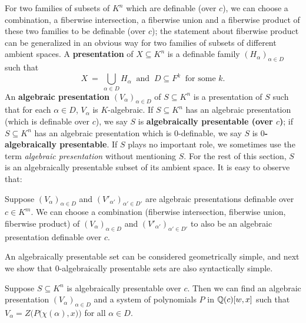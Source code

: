 For two families of subsets of $K^n$ which are definable (over $c$), we can choose  a combination, a fiberwise intersection, a fiberwise union and a fiberwise product of these two families to be definable (over $c$); the statement about fiberwise product can be generalized in an obvious way for two families of subsets of different ambient spaces.
A {\bf presentation} of  $X \subseteq K^n$ is a definable family $( H_\alpha)_{\alpha \in D}$ such that $$X\ =\ \bigcup_{\alpha \in D} H_\alpha\ \text{ and }\ D\subseteq F^k\ \text{ for some } k.$$ 
An {\bf algebraic presentation} $( V_\alpha)_{\alpha \in D}$ of $S\subseteq K^n$ is a presentation of $S$ such that for each $\alpha \in D$, $V_\alpha$ is $K$-algebraic.
If $ S \subseteq K^n$ has an algebraic presentation (which is definable over $c$), we say $S$ is { \bf algebraically presentable (over $c$)}; if $S\subseteq K^n$ has an algebraic presentation which is $0$-definable, we say $S$ is {\bf $0$-algebraically presentable}. If $S$ plays no important role, we sometimes use the term {\it algebraic presentation} without mentioning $S$. For the rest of this section, $S$ is an algebraically presentable subset of its ambient space. It is easy to observe that:

\begin{lem}
Suppose  $(V_\alpha)_{ \alpha \in D}$  and  $(V'_{\alpha'})_{ \alpha' \in D'}$ are algebraic presentations definable over $c \in K^m$.
We can choose a combination (fiberwise intersection, fiberwise union, fiberwise product) of $(V_\alpha)_{ \alpha \in D}$ and $(V'_{\alpha'})_{ \alpha' \in D'}$  to also be an algebraic presentation definable over $c$. 
\end{lem}


\noindent
An algebraically presentable set can be considered geometrically simple, and next we show that $0$-algebraically presentable sets are also syntactically simple.

\begin{lem} \label{APsimple1}
Suppose $ S \subseteq K^n$ is algebraically presentable over $c$. Then we can find an algebraic presentation $(V_\alpha)_{ \alpha \in D}$ and a system of polynomials $P$ in $\mathbb{Q}(c)[w,x]$ such that $V_\alpha = Z\Big( P\big(\chi(\alpha),x\big)\Big)$ for all $\alpha \in D$.
\end{lem}

